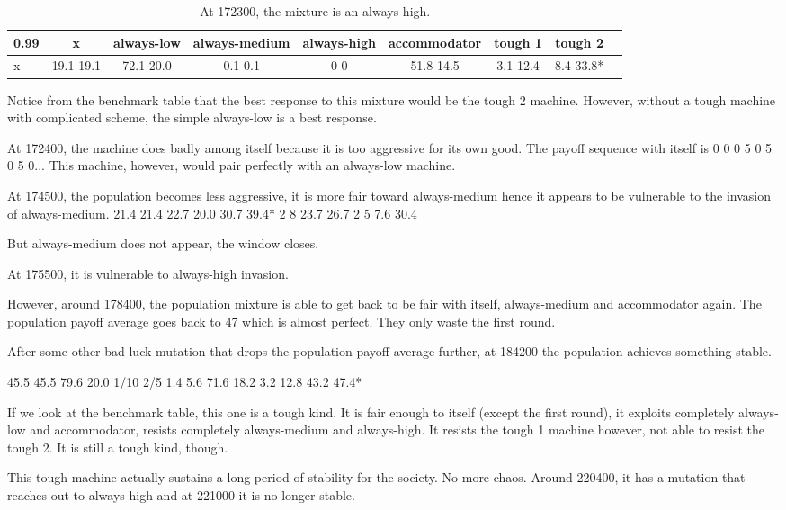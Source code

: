 \documentclass[12.5pt]{report}
\begin{document}
\begin{table}[h!]
\center
\begin{tabular}{l|cccccccc}
\textbf{0.99}& x & always-low & always-medium & always-high & accommodator &tough 1 & tough 2\\
\hline
x& 19.1 19.1  &    72.1 20.0    &   0.1 0.1  &        0 0   &      51.8 14.5   &   3.1 12.4  &     8.4 33.8* \\
\end{tabular}
\caption{At 172300, the mixture is an always-high.}
\end{table}

Notice from the benchmark table that the best response to this mixture would be the tough 2 machine. However, without a tough machine with complicated scheme, the simple always-low is a best response.

At 172400, the machine does badly among itself because it is too aggressive for its own good. The payoff sequence with itself is 0 0 0 5 0 5 0 5 0... This machine, however, would pair perfectly with an always-low machine.

At 174500, the population becomes less aggressive, it is more fair toward always-medium hence it appears to be vulnerable to the invasion of always-medium.
21.4 21.4      22.7 20.0      30.7 39.4*        2 8         23.7 26.7         2 5         7.6 30.4 

But always-medium does not appear, the window closes.

At 175500, it is vulnerable to always-high invasion.

However, around 178400, the population mixture is able to get back to be fair with itself, always-medium and accommodator again. The population payoff average goes back to 47 which is almost perfect. They only waste the first round.

After some other bad luck mutation that drops the population payoff average further, at 184200 the population achieves something stable.

45.5 45.5      79.6 20.0      1/10 2/5        1.4 5.6       71.6 18.2      3.2 12.8       43.2 47.4*

If we look at the benchmark table, this one is a tough kind. It is fair enough to itself (except the first round), it exploits completely always-low and accommodator, resists completely always-medium and always-high. It resists the tough 1 machine however, not able to resist the tough 2. It is still a tough kind, though.

This tough machine actually sustains a long period of stability for the society. No more chaos. Around 220400, it has a mutation that reaches out to always-high and at 221000 it is no longer stable.
\end{document}
